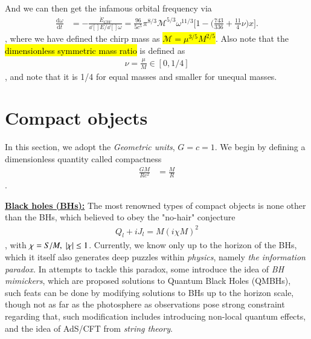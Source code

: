 \documentclass[a4paper, 12pt]{article}
\begin{document}
      And we can then get the infamous orbital frequency via 
      \begin{align}
        \label{orbital frequency}
        \frac{\mathrm{d}\omega}{\mathrm{d}t} &= -
        \frac{\dot{E}_{GW}}{\dd[]{E}/\dd[]{\omega}} =
        \frac{96}{5 c^5} \pi^{8/3} \mathcal{M}^{5/3}
        \omega^{11/3} \bigg[1 - \bigg(\frac{743}{336} +
        \frac{11}{4} \nu \bigg) x \bigg].    
      \end{align}, where we have defined the chirp mass as \hl{$ 
      \mathcal{M}  = \mu^{3/5} M^{2/5}  $}. Also note that the
      \hl{dimensionless symmetric mass ratio} is defined as 
      \begin{align}
        \label{dimensionless symmetric mass ratio}
        \nu = \frac{\mu}{M} \in [0, 1/4]
      \end{align}, and note that it is 1/4 for equal masses and smaller
      for unequal masses. 
      

      \section{Compact objects}%
        \label{sec:Compact objects}
        
        In this section, we adopt the \textit{Geometric units}, \(
        G=c=1 \). We begin by defining a dimensionless quantity
        called compactness 
        \begin{align}
          \label{compactness}
          \frac{GM}{Rc^2} &= \frac{M}{R} 
        \end{align}. 

        \textbf{\underline{Black holes (BHs):}}
        The most renowned types of compact objects is none other than
        the BHs, which believed to obey the "no-hair" conjecture \begin{align}
          \label{no-har bro}
          Q_l + i J_l = M(i\chi M)^2
        \end{align}, with \( \chi = S/M, \hspace{0.1cm} |\chi| \leq 1
        \). Currently, we know only up to the horizon of the BHs,
        which it itself also generates deep puzzles within
        \textit{physics}, namely \textit{the information paradox.}
        In attempts to tackle this paradox, some introduce the idea
        of \textit{BH mimickers}, which are proposed solutions to
        Quantum Black Holes (QMBHs), such feats can be done by
        modifying solutions to BHs up to the horizon scale, though
        not as far as the photosphere as observations pose strong
        constraint regarding that, such modification includes
        introducing non-local quantum effects, and the idea of
        AdS/CFT from \textit{string theory}.
\end{document}
